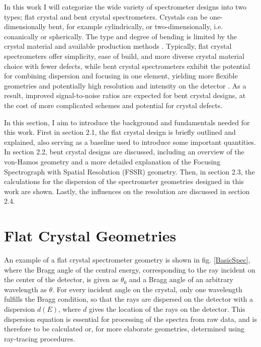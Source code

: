 In this work I will categorize the wide variety of spectrometer 
designs into 
two types; flat crystal and bent crystal spectrometers. Crystals can be 
one-dimensionally 
bent, for example cylindrically, or two-dimensionally, i.e. 
conanically or 
spherically. The type and degree of bending is limited by the 
crystal material 
and available production methods \citep{kunze2009introduction}. 
Typically, flat 
crystal spectrometers 
offer simplicity, ease of build, and more diverse crystal material choice 
with fewer 
defects, while bent crystal spectrometers exhibit the potential for combining dispersion and focusing in one element, yielding 
more 
flexible geometries and potentially high resolution and intensity 
on the detector 
\citep{renner2019challenges,kunze2009introduction}. As a result, 
improved 
signal-to-noise ratios are expected for bent crystal designs, at the 
cost of 
more complicated schemes and potential for crystal defects. 

In this section, I aim to introduce the background and fundamentals 
needed for 
this work. First in section 2.1, the flat crystal design is briefly 
outlined 
and 
explained, also serving as a baseline used to introduce some 
important 
quantities. In section 2.2, bent crystal designs are discussed, 
including an 
overview of the von-Hamos geometry and a more detailed 
explanation of the Focusing Spectrograph with Spatial Resolution (FSSR) 
geometry. Then, in section 2.3, the 
calculations for the dispersion of the spectrometer geometries designed in this work are shown. Lastly, the influences on the resolution are discussed in 
section 2.4.


\section{Flat Crystal Geometries}
\label{section: flat crystal geometry}

An example of a flat crystal spectrometer geometry is shown in fig. 
\ref{BasicSpec}, where the Bragg angle of the central energy, corresponding to 
the ray incident on the center of the detector, is given as 
$\theta_0$ and a Bragg angle of an arbitrary wavelength as $\theta$. For every 
incident angle on the crystal, only one wavelength fulfills the Bragg 
condition, so that the rays are dispersed on the detector with a dispersion 
$d(E)$, where $d$ gives the location of the rays on the detector. 
This 
dispersion equation is essential for processing of the spectra from 
raw data, and is 
therefore to be calculated or, for more elaborate geometries, 
determined using 
ray-tracing procedures.

